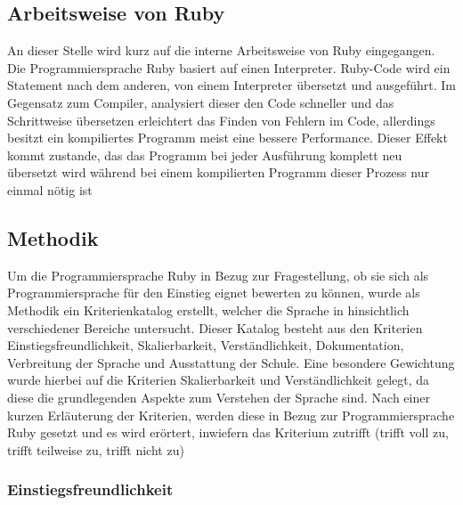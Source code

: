 \documentclass[12pt,DIV=14, version=first, BCOR=10mm,a4paper,twoside,parskip=half-,headsepline,headinclude]{scrartcl}
\begin{document}
\subsection{Arbeitsweise von Ruby}
\begin{flushleft}
An dieser Stelle wird kurz auf die interne Arbeitsweise von Ruby eingegangen. Die Programmiersprache Ruby basiert auf einen Interpreter. Ruby-Code wird ein Statement nach dem anderen, von einem Interpreter übersetzt und ausgeführt. Im Gegensatz zum Compiler, analysiert dieser den Code schneller und das Schrittweise übersetzen erleichtert das Finden von Fehlern im Code, allerdings besitzt ein kompiliertes Programm meist eine bessere Performance. Dieser Effekt kommt zustande, das das Programm bei jeder Ausführung komplett neu übersetzt wird während bei einem kompilierten Programm dieser Prozess nur einmal nötig ist
\end{flushleft}

\subsection{Methodik}
\begin{flushleft}
Um die Programmiersprache Ruby in Bezug zur Fragestellung, ob sie sich als Programmiersprache für den Einstieg eignet bewerten zu können, wurde als Methodik ein Kriterienkatalog erstellt, welcher die Sprache in hinsichtlich verschiedener Bereiche untersucht. Dieser Katalog besteht aus den Kriterien Einstiegsfreundlichkeit, Skalierbarkeit, Verständlichkeit, Dokumentation, Verbreitung der Sprache und Ausstattung der Schule. Eine besondere Gewichtung wurde hierbei auf die Kriterien Skalierbarkeit und Verständlichkeit gelegt, da diese die grundlegenden Aspekte zum Verstehen der Sprache sind. Nach einer kurzen Erläuterung der Kriterien, werden diese in Bezug zur Programmiersprache Ruby gesetzt und es wird erörtert, inwiefern das Kriterium zutrifft (trifft voll zu, trifft teilweise zu, trifft nicht zu)
\end{flushleft}

\subsubsection{Einstiegsfreundlichkeit}
\end{document}
